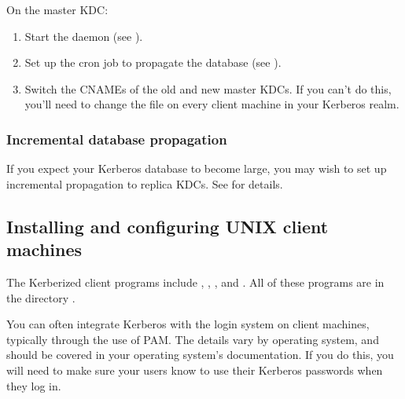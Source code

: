 \documentclass[letterpaper,10pt,english]{sphinxmanual}
\begin{document}
On the  master KDC:
\begin{enumerate}
\item {} 
Start the {\hyperref[\detokenize{admin/admin_commands/kadmind:kadmind-8}]{}} daemon (see {\hyperref[\detokenize{admin/install_kdc:start-kdc-daemons}]{}}).

\item {} 
Set up the cron job to propagate the database (see
{\hyperref[\detokenize{admin/install_kdc:kprop-to-replicas}]{}}).

\item {} 
Switch the CNAMEs of the old and new master KDCs.  If you can’t do
this, you’ll need to change the {\hyperref[\detokenize{admin/conf_files/krb5_conf:krb5-conf-5}]{}} file on every
client machine in your Kerberos realm.

\end{enumerate}


\subsubsection{Incremental database propagation}
\label{\detokenize{admin/install_kdc:incremental-database-propagation}}
If you expect your Kerberos database to become large, you may wish to
set up incremental propagation to replica KDCs.  See
{\hyperref[\detokenize{admin/database:incr-db-prop}]{}} for details.


\subsection{Installing and configuring UNIX client machines}
\label{\detokenize{admin/install_clients:installing-and-configuring-unix-client-machines}}\label{\detokenize{admin/install_clients::doc}}
The Kerberized client programs include ,
, , and .  All of
these programs are in the directory {\hyperref[\detokenize{mitK5defaults:paths}]{}}.

You can often integrate Kerberos with the login system on client
machines, typically through the use of PAM.  The details vary by
operating system, and should be covered in your operating system’s
documentation.  If you do this, you will need to make sure your users
know to use their Kerberos passwords when they log in.
\end{document}
